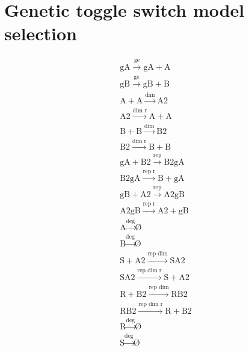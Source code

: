 \section{Genetic toggle switch model selection}
    
$$
\begin{array}{cccc}
      \textrm{gA}\stackrel{\textrm{ge}}{\longrightarrow}\textrm{gA} + \textrm{A} \\
      \textrm{gB}\stackrel{\textrm{ge}}{\longrightarrow}\textrm{gB} + \textrm{B} \\
      \textrm{A} + \textrm{A} \stackrel{\textrm{dim}}{\longrightarrow}\textrm{A2} \\
      \textrm{A2} \stackrel{\textrm{dim r}}{\longrightarrow}\textrm{A} + \textrm{A} \\
      \textrm{B} + \textrm{B} \stackrel{\textrm{dim}}{\longrightarrow} \textrm{B2} \\
      \textrm{B2} \stackrel{\textrm{dim r}}{\longrightarrow}\textrm{B} + \textrm{B} \\
      \textrm{gA} + \textrm{B2} \stackrel{\textrm{rep}}{\longrightarrow}\textrm{B2gA} \\
      \textrm{B2gA} \stackrel{\textrm{rep r}}{\longrightarrow}\textrm{B} + \textrm{gA} \\
      \textrm{gB} + \textrm{A2} \stackrel{\textrm{rep}}{\longrightarrow}\textrm{A2gB} \\
      \textrm{A2gB} \stackrel{\textrm{rep r}}{\longrightarrow}\textrm{A2} + \textrm{gB} \\
      \textrm{A} \stackrel{\textrm{deg}}{\longrightarrow}\textrm{\O}\\
      \textrm{B} \stackrel{\textrm{deg}}{\longrightarrow}\textrm{\O}\\
      \textrm{S} + \textrm{A2} \stackrel{\textrm{rep dim}}{\longrightarrow}\textrm{SA2}\\
      \textrm{SA2} \stackrel{\textrm{rep dim r}}{\longrightarrow}\textrm{S} + \textrm{A2}\\
      \textrm{R} + \textrm{B2} \stackrel{\textrm{rep dim}}{\longrightarrow}\textrm{RB2}\\
      \textrm{RB2} \stackrel{\textrm{rep dim r}}{\longrightarrow}\textrm{R} + \textrm{B2}\\
      \textrm{R} \stackrel{\textrm{deg}}{\longrightarrow} \textrm{\O}\\
      \textrm{S} \stackrel{\textrm{deg}}{\longrightarrow}\textrm{\O}\\
\end{array}
$$

